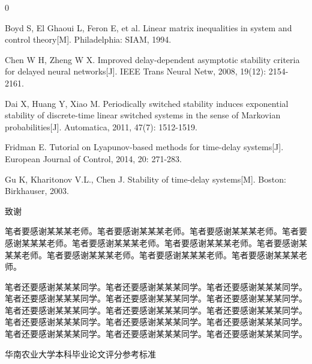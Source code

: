 \documentclass[a4paper, 12pt, oneside]{article}
\theoremstyle{cn_theorem}
\begin{document}
{\songti\rmfamily
\begin{thebibliography}{0}
\vspace{-1.7em}

 Boyd S, El Ghaoui L, Feron E, et al. Linear matrix inequalities in system and control theory[M]. Philadelphia: SIAM, 1994.

 Chen W H, Zheng W X. Improved delay-dependent asymptotic stability criteria for delayed neural networks[J]. IEEE Trans Neural Netw, 2008, 19(12): 2154-2161.

 Dai X, Huang Y, Xiao M. Periodically switched stability induces exponential stability of discrete-time linear switched systems in the sense of Markovian probabilities[J]. Automatica, 2011, 47(7): 1512-1519.

 Fridman E. Tutorial on Lyapunov-based methods for time-delay systems[J]. European Journal of Control, 2014, 20: 271-283.

 Gu K, Kharitonov V.L., Chen J. Stability of time-delay systems[M]. Boston: Birkhauser, 2003.

\end{thebibliography}
}

\clearpage
{}
{}
\centerline{\heiti 致\hspace{4em}谢}
\vspace{1em}
{\songti
笔者要感谢某某某老师。笔者要感谢某某某老师。笔者要感谢某某某老师。笔者要感谢某某某老师。笔者要感谢某某某老师。笔者要感谢某某某老师。笔者要感谢某某某老师。笔者要感谢某某某老师。笔者要感谢某某某老师。笔者要感谢某某某老师。

笔者还要感谢某某某同学。笔者还要感谢某某某同学。笔者还要感谢某某某同学。笔者还要感谢某某某同学。笔者还要感谢某某某同学。笔者还要感谢某某某同学。笔者还要感谢某某某同学。笔者还要感谢某某某同学。笔者还要感谢某某某同学。笔者还要感谢某某某同学。笔者还要感谢某某某同学。笔者还要感谢某某某同学。笔者还要感谢某某某同学。笔者还要感谢某某某同学。笔者还要感谢某某某同学。
}

\clearpage
\thispagestyle{empty}
\vspace{1em}

\begin{center}
    {\heiti 华南农业大学本科毕业论文评分参考标准}
\end{center}
\end{document}
